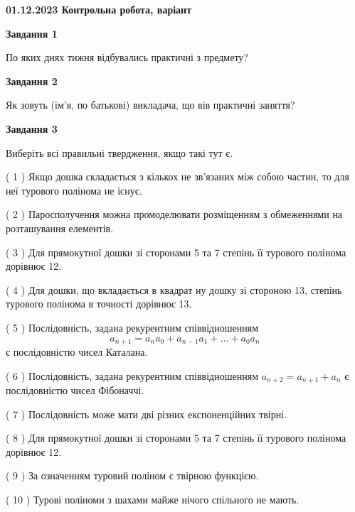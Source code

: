\documentclass[12pt, ukrainian]{article}
\begin{document}
\begin {large}

\textbf{01.12.2023 Контрольна робота, варіант  }\par


{
{\begin {center}\textbf{Завдання 1}\end {center}}\par
По яких днях тижня відбувались практичні з предмету?\par
{\begin {center}\textbf{Завдання 2}\end {center}}\par
Як зовуть (ім'я, по батькові) викладача, що вів практичні заняття?\par
{\begin {center}\textbf{Завдання 3}\end {center}}\par
Виберіть всі правильні твердження, якщо такі тут є.\par
\vspace{2mm}
( 1 ) Якщо дошка складається з кількох не зв’язаних між собою частин, то для неї турового полінома не існує.%

( 2 ) Паросполучення можна промоделювати розміщенням з обмеженнями на розташування елементів.%

( 3 ) Для прямокутної дошки зі сторонами 5 та 7 степінь її турового полінома дорівнює 12.%

( 4 ) Для дошки, що вкладається в квадрат ну дошку зі стороною 13, степінь турового полінома в точності дорівнює 13.%

( 5 ) Послідовність, задана рекурентним співвідношенням $$a_{n+1}=a_{n}a_{0}+a_{n-1}a_{1}+\ldots+a_0a_{n}$$ є послідовністю чисел Каталана.%

( 6 ) Послідовність, задана рекурентним співвідношенням $a_{n+2}=a_{n+1}+a_{n}$ є послідовністю чисел Фібоначчі.%

( 7 ) Послідовність може мати дві різних експоненційних твірні.%

( 8 ) Для прямокутної дошки зі сторонами 5 та 7 степінь її турового полінома дорівнює 12.%

( 9 ) За означенням туровий поліном є твірною функцією.%

( 10 ) Турові поліноми з шахами майже нічого спільного не мають.%
}
\end {large}

\vspace{4mm}
\newpage
\end{document}
